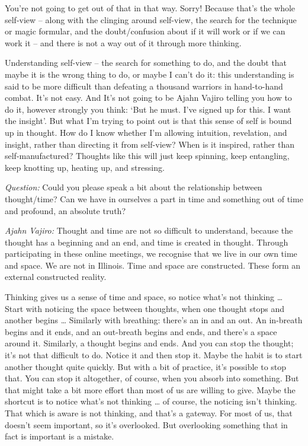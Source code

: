 You're not going to get out of that in that way. Sorry! Because that's the whole
self-view -- along with the clinging around self-view, the search for the
technique or magic formular, and the doubt/confusion about if it will work or if
we can work it -- and there is not a way out of it through more thinking.

\enlargethispage{\baselineskip}

Understanding self-view -- the search for something to do, and the doubt that
maybe it is the wrong thing to do, or maybe I can't do it: this understanding is
said to be more difficult than defeating a thousand warriors in hand-to-hand
combat. It's not easy. And It's not going to be Ajahn Vajiro telling you how to
do it, however strongly you think: `But he must. I've signed up for this. I want
the insight'. But what I'm trying to point out is that this sense of self is
bound up in thought. How do I know whether I'm allowing intuition, revelation,
and insight, rather than directing it from self-view? When is it inspired,
rather than self-manufactured? Thoughts like this will just keep spinning, keep
entangling, keep knotting up, heating up, and stressing.

\bigskip

\emph{Question:} Could you please speak a bit about the relationship between
thought/time? Can we have in ourselves a part in time and something out of time
and profound, an absolute truth?

\emph{Ajahn Vajiro:} Thought and time are not so difficult to understand, because the
thought has a beginning and an end, and time is created in thought. Through
participating in these online meetings, we recognise that we live in our own
time and space. We are not in Illinois. Time and space are constructed. These
form an external constructed reality.

Thinking gives us a sense of time and space, so notice what's not thinking
\ldots{} Start with noticing the space between thoughts, when one thought stops
and another begins \ldots{} Similarly with breathing: there's an in and an out.
An in-breath begins and it ends, and an out-breath begins and ends, and there's
a space around it. Similarly, a thought begins and ends. And you can stop the
thought; it's not that difficult to do. Notice it and then stop it. Maybe the
habit is to start another thought quite quickly. But with a bit of practice,
it's possible to stop that. You can stop it altogether, of course, when you
absorb into something. But that might take a bit more effort than most of us are
willing to give. Maybe the shortcut is to notice what's not thinking \ldots{} of
course, the noticing isn't thinking. That which is aware is not thinking, and
that's a gateway. For most of us, that doesn't seem important, so it's
overlooked. But overlooking something that in fact is important is a mistake.

